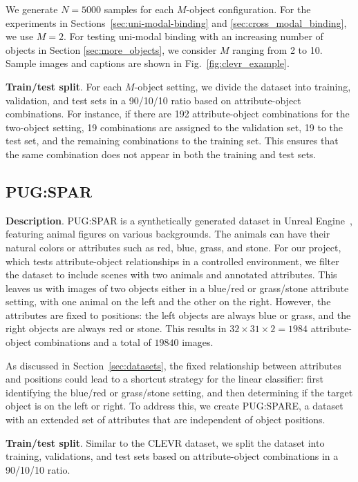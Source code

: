 We generate $N=5000$ samples for each $M$-object configuration. For the experiments in Sections~\ref{sec:uni-modal-binding} and \ref{sec:cross_modal_binding}, we use $M = 2$. For testing uni-modal binding with an increasing number of objects in Section \ref{sec:more_objects}, we consider $M$ ranging from 2 to 10. Sample images and captions are shown in Fig.~\ref{fig:clevr_example}.


\noindent
\textbf{Train/test split}. For each $M$-object setting, we divide the dataset into training, validation, and test sets in a 90/10/10 ratio based on attribute-object combinations. For instance, if there are 192 attribute-object combinations for the two-object setting, 19 combinations are assigned to the validation set, 19 to the test set, and the remaining combinations to the training set. This ensures that the same combination does not appear in both the training and test sets.

\subsection{PUG:SPAR}

\textbf{Description}. PUG:SPAR is a synthetically generated dataset in Unreal Engine~\cite{Bordes2024}, featuring animal figures on various backgrounds. The animals can have their natural colors or attributes such as red, blue, grass, and stone. For our project, which tests attribute-object relationships in a controlled environment, we filter the dataset to include scenes with two animals and annotated attributes. This leaves us with images of two objects either in a blue/red or grass/stone attribute setting, with one animal on the left and the other on the right. However, the attributes are fixed to positions: the left objects are always blue or grass, and the right objects are always red or stone. This results in \( 32 \times 31 \times 2 = 1984 \) attribute-object combinations and a total of $19840$ images.

As discussed in Section~\ref{sec:datasets}, the fixed relationship between attributes and positions could lead to a shortcut strategy for the linear classifier: first identifying the blue/red or grass/stone setting, and then determining if the target object is on the left or right. To address this, we create PUG:SPARE, a dataset with an extended set of attributes that are independent of object positions.

\noindent
\textbf{Train/test split}. Similar to the CLEVR dataset, we split the dataset into training, validations, and test sets based on attribute-object combinations in a 90/10/10 ratio.


